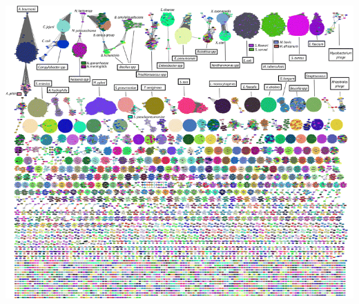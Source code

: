 \begin{frame}
\begin{center}
    \includegraphics[height=0.6\textheight]{images/mash_cluster}
  \end{center}  
\end{frame}

%
